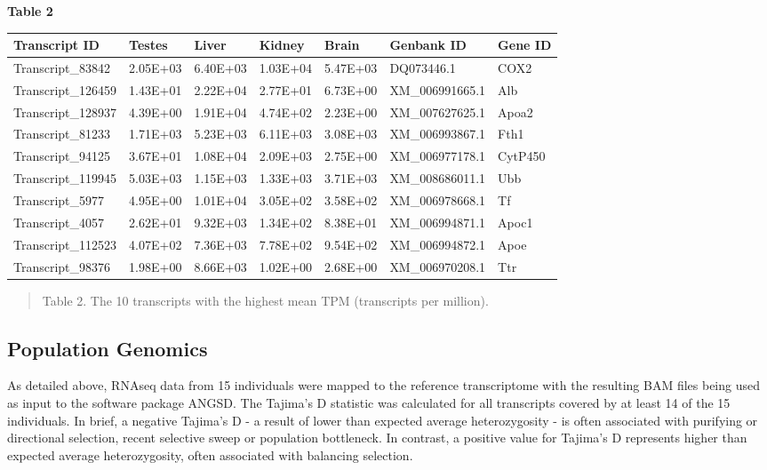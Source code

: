 \documentclass[11pt]{article}
\begin{document}
\textbf{\hypertarget{Table 2}{Table 2}} \\
\begin{center}
\begin{adjustwidth}{-.05in}{-.05in}%
\begin{tabular}{ l l l l l l l}
\textbf{Transcript ID}	&	\textbf{Testes}	&	\textbf{Liver}	&	\textbf{Kidney}	&	\textbf{Brain}	&	\textbf{Genbank ID}	&	\textbf{Gene ID}	\\
\hline
Transcript\_83842	&	2.05E+03	&	6.40E+03	&	1.03E+04	&	5.47E+03	&	DQ073446.1	&	COX2	\\
Transcript\_126459	&	1.43E+01	&	2.22E+04	&	2.77E+01	&	6.73E+00	&	XM\_006991665.1	&	Alb	\\
Transcript\_128937	&	4.39E+00	&	1.91E+04	&	4.74E+02	&	2.23E+00	&	XM\_007627625.1	&	Apoa2	\\
Transcript\_81233	&	1.71E+03	&	5.23E+03	&	6.11E+03	&	3.08E+03	&	XM\_006993867.1	&	Fth1	\\
Transcript\_94125	&	3.67E+01	&	1.08E+04	&	2.09E+03	&	2.75E+00	&	XM\_006977178.1	&	CytP450	\\
Transcript\_119945	&	5.03E+03	&	1.15E+03	&	1.33E+03	&	3.71E+03	&	XM\_008686011.1	&	Ubb	\\
Transcript\_5977	&	4.95E+00	&	1.01E+04	&	3.05E+02	&	3.58E+02	&	XM\_006978668.1	&	Tf	\\
Transcript\_4057	&	2.62E+01	&	9.32E+03	&	1.34E+02	&	8.38E+01	&	XM\_006994871.1	&	Apoc1	\\
Transcript\_112523	&	4.07E+02	&	7.36E+03	&	7.78E+02	&	9.54E+02	&	XM\_006994872.1	&	Apoe	\\
Transcript\_98376	&	1.98E+00	&	8.66E+03	&	1.02E+00	&	2.68E+00	&	XM\_006970208.1	&	Ttr	\\
\end{tabular}
\end{adjustwidth}
\end{center}
\begin{quote}
\small{Table 2. The 10 transcripts with the highest mean TPM (transcripts per million).}
\end{quote}  



\subsection*{Population Genomics}

As detailed above, RNAseq data from 15 individuals were mapped to the reference transcriptome with the resulting BAM files being used as input to the software package ANGSD. The Tajima's D statistic was calculated for all  transcripts covered by at least 14 of the 15 individuals. In brief, a negative Tajima's D - a result of lower than expected average heterozygosity - is often associated with purifying or directional selection, recent selective sweep or population bottleneck. In contrast, a positive value for Tajima's D represents higher than expected average heterozygosity, often associated with balancing selection. \\ 
\end{document}
